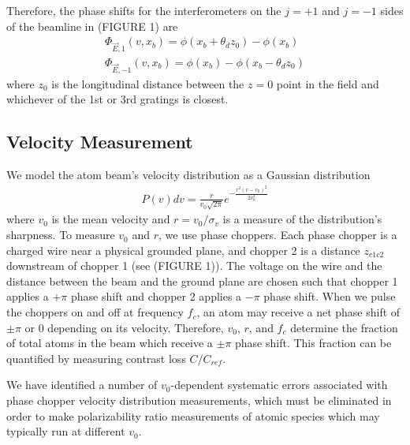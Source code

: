\documentclass[12pt,letterpaper]{article}
\begin{document}
Therefore, the phase shifts for the interferometers on the $j=+1$ and $j=-1$ sides of the beamline in (FIGURE 1) are
\begin{align}
	\Phi_{\vec{E},1}(v,x_b) = \phi(x_b+\theta_d z_0) - \phi(x_b) \nonumber \\
	\Phi_{\vec{E},-1}(v,x_b) = \phi(x_b) - \phi(x_b-\theta_d z_0)
	\label{deltaPhasePillars}
\end{align}
where $z_0$ is the longitudinal distance between the $z=0$ point in the field and whichever of the 1st or 3rd gratings is closest.

\subsection{Velocity Measurement}

We model the atom beam's velocity distribution as a Gaussian distribution
\begin{align}
	P(v)dv = \frac{r}{v_0\sqrt{2\pi}}e^{-\frac{r^2(v-v_0)^2}{2v_0^2}}
\end{align}
where $v_0$ is the mean velocity and $r = v_0/\sigma_v$ is a measure of the distribution's sharpness. To measure $v_0$ and $r$, we use phase choppers. Each phase chopper is a charged wire near a physical grounded plane, and chopper 2 is a distance $z_{c1c2}$ downstream of chopper 1 (see (FIGURE 1)). The voltage on the wire and the distance between the beam and the ground plane are chosen such that chopper 1 applies a $+\pi$ phase shift and chopper 2 applies a $-\pi$ phase shift. When we pulse the choppers on and off at frequency $f_c$, an atom may receive a net phase shift of $\pm\pi$ or $0$ depending on its velocity. Therefore, $v_0$, $r$, and $f_c$ determine the fraction of total atoms in the beam which receive a $\pm\pi$ phase shift. This fraction can be quantified by measuring contrast loss $C/C_{ref}$. 

We have identified a number of $v_0$-dependent systematic errors associated with phase chopper velocity distribution measurements, which must be eliminated in order to make polarizability ratio measurements of atomic species which may typically run at different $v_0$.
\end{document}
